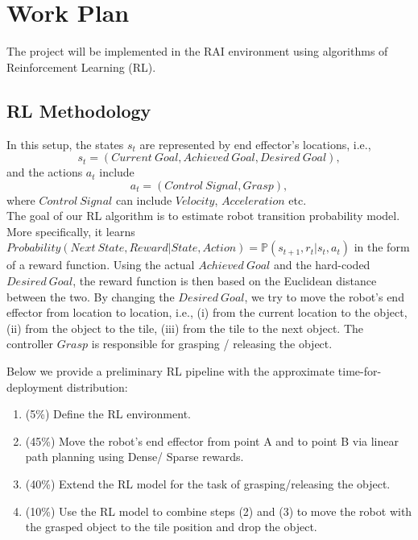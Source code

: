 \documentclass[a4paper,11pt,twoside]{article}
\begin{document}
\section{Work Plan} \label{Sec:WorkPlan}
The project will be implemented in the RAI environment using algorithms of Reinforcement Learning (RL).

\subsection{RL Methodology} \label{SubSec:RL}
In this setup, the states $s_t$ are represented by end effector's locations, i.e.,
\begin{equation*}
    s_t = (Current~Goal, Achieved~Goal, Desired~Goal),
\end{equation*}
and the actions $a_t$ include
\begin{equation*}
    a_t = (Control~Signal, Grasp),
\end{equation*}
where $Control~Signal$ can include $Velocity$, $Acceleration$ etc.\\

The goal of our RL algorithm is to estimate robot transition probability model. More specifically, it learns $Probability(Next~State, Reward | State, Action) = \mathbb{P}(s_{t+1}, r_t| s_t, a_t)$ in the form of a reward function. Using the actual $Achieved~Goal$ and the hard-coded $Desired~Goal$, the reward function is then based on the Euclidean distance between the two. By changing the $Desired~Goal$, we try to move the robot's end effector from location to location, i.e., (i) from the current location to the object, (ii) from the object to the tile, (iii) from the tile to the next object. The controller $Grasp$ is responsible for grasping / releasing the object.

Below we provide a preliminary RL pipeline with the approximate time-for-deployment distribution:
\begin{enumerate}
    \item (5\%) Define the RL environment.
    \item (45\%) Move the robot's end effector from point A and to point B via linear path planning using Dense/ Sparse rewards.
    \item (40\%) Extend the RL model for the task of grasping/releasing the object.
    \item (10\%) Use the RL model to combine steps (2) and (3) to move the robot with the grasped object to the tile position and drop the object.
\end{enumerate}
\end{document}
